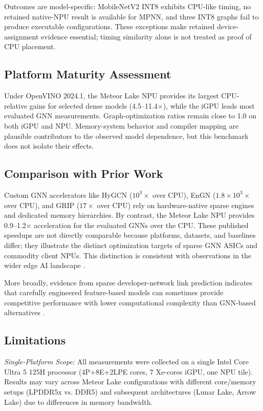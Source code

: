 \documentclass[conference]{IEEEtran}
\begin{document}
Outcomes are model-specific: MobileNetV2 INT8 exhibits CPU-like timing, no retained native-NPU result is available for MPNN, and three INT8 graphs fail to produce executable configurations. These exceptions make retained device-assignment evidence essential; timing similarity alone is not treated as proof of CPU placement.

\subsection{Platform Maturity Assessment}
Under OpenVINO 2024.1, the Meteor Lake NPU provides its largest CPU-relative gains for selected dense models (4.5--11.4$\times$), while the iGPU leads most evaluated GNN measurements. Graph-optimization ratios remain close to 1.0 on both iGPU and NPU. Memory-system behavior and compiler mapping are plausible contributors to the observed model dependence, but this benchmark does not isolate their effects.

\subsection{Comparison with Prior Work}
Custom GNN accelerators like HyGCN \cite{9065592} ($10^{3}\times$ over CPU), EnGN \cite{9161360} ($1.8\times10^{3}\times$ over CPU), and GRIP \cite{9858684} ($17\times$ over CPU) rely on hardware-native sparse engines and dedicated memory hierarchies. By contrast, the Meteor Lake NPU provides 0.9--1.2$\times$ acceleration for the evaluated GNNs over the CPU. These published speedups are not directly comparable because platforms, datasets, and baselines differ; they illustrate the distinct optimization targets of sparse GNN ASICs and commodity client NPUs. This distinction is consistent with observations in the wider edge AI landscape \cite{SINGH202371}.

More broadly, evidence from sparse developer-network link prediction indicates that carefully engineered feature-based models can sometimes provide competitive performance with lower computational complexity than GNN-based alternatives \cite{Bayraktar2026}.

\subsection{Limitations}

\textit{Single-Platform Scope:} All measurements were collected on a single Intel Core Ultra 5 125H processor (4P+8E+2LPE cores, 7 Xe-cores iGPU, one NPU tile). Results may vary across Meteor Lake configurations with different core/memory setups (LPDDR5x vs. DDR5) and subsequent architectures (Lunar Lake, Arrow Lake) due to differences in memory bandwidth.
\end{document}
